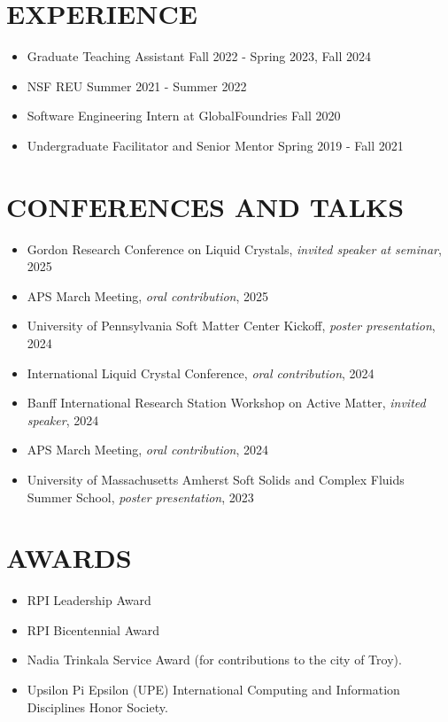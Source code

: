 \documentclass[margin, 10pt]{res} %
\begin{document}
\begin{resume}
\section{EXPERIENCE}
\begin{itemize}
 \item Graduate Teaching Assistant \hfill Fall 2022 - Spring 2023, Fall 2024
 \item NSF REU \hfill Summer 2021 - Summer 2022
 \item Software Engineering Intern at GlobalFoundries \hfill Fall 2020
\item Undergraduate Facilitator and Senior Mentor \hfill Spring 2019 - Fall 2021
\end{itemize}

\section{CONFERENCES AND TALKS}
\begin{itemize}
    \item Gordon Research Conference on Liquid Crystals, {\it invited speaker at seminar}, 2025
    \item APS March Meeting, {\it oral contribution}, 2025
    \item University of Pennsylvania Soft Matter Center Kickoff, {\it poster presentation}, 2024
    \item International Liquid Crystal Conference, {\it oral contribution}, 2024
    \item Banff International Research Station Workshop on Active Matter, {\it invited speaker}, 2024
    \item APS March Meeting, {\it oral contribution}, 2024
    \item University of Massachusetts Amherst Soft Solids and Complex Fluids Summer School, {\it poster presentation}, 2023
\end{itemize}
    
\section{AWARDS}
\begin{itemize}
\item RPI Leadership Award
\item RPI Bicentennial Award
    \item Nadia Trinkala Service Award (for contributions to the city of Troy).
    \item Upsilon Pi Epsilon (UPE) International Computing and Information Disciplines Honor Society.
    \end{itemize}



\end{resume}
\end{document}
